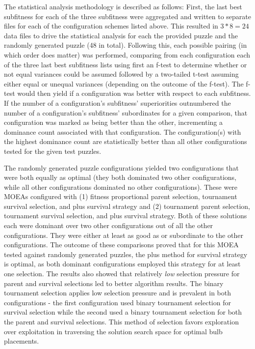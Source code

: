 \documentclass[11pt]{article}
\begin{document}
The statistical analysis
methodology is described as follows: First, the last best subfitness for each of the three 
subfitness were aggregated and written to separate 
files for each of the configuration schemes listed above. This resulted in 
\begin{math} 3 * 8 = 24 \end{math} data files
to drive the statistical analysis for each the provided puzzle and the randomly generated puzzle 
(48 in total).
Following this, each possible pairing (in which order does matter) was performed, 
comparing from each configuration each of the three last best subfitness lists using first an f-test to determine whether or not equal
variances could be assumed followed by a two-tailed t-test assuming either equal or unequal variances (depending on the 
outcome of the f-test). The f-test would then yield if a configuration was better with respect to each subfitness.
If the number of a configuration's subfitness' superiorities outnumbered the number of a configuration's subfitness'
subordinates for a given comparison, that configuration was marked as being better than the other, incrementing a 
dominance count associated with that configuration. The configuration(s) with the highest dominance count are statistically
better than all other configurations tested for the given test puzzles.

The randomly generated puzzle configurations yielded two configurations that were both 
equally as optimal (they both dominated two other configurations, while all other configurations
dominated no other configurations). These were MOEAs configured 
with (1) fitness proportional parent selection, tournament survival selection, 
and plus survival strategy and (2) tournament parent
selection, tournament survival selection, and plus survival strategy. 
Both of these solutions each were dominant over two other configurations
out of all the other configurations. They were either at least as good as or 
subordinate to the other configurations.
The outcome of these comparisons proved that for this MOEA tested against randomly generated 
puzzles, the plus method for survival strategy is optimal, as both dominant 
configurations employed this strategy for at least one selection. The results also showed 
that relatively \textit{low} selection pressure for parent and survival
selections led to better algorithm results. The binary tournament selection applies low selection
pressure and is prevalent in both configurations - the first configuration used binary tournament 
selection for survival selection while the second used a binary tournament selection for 
both the parent 
and survival selections. This method of selection favors exploration over exploitation in
traversing the solution search space for optimal bulb placements.
\end{document}
